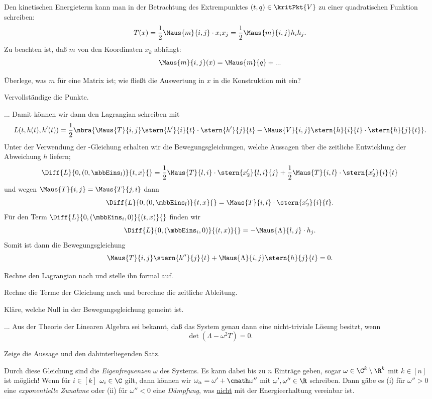 \documentclass[../WiSe22ANA3.tex]{subfiles}
\begin{document}
			Den kinetischen Energieterm kann man in der Betrachtung des Extrempunktes $(t,q)\in\kritPkt{V}$ zu einer quadratischen Funktion schreiben:
			$$T(x)=\frac{1}{2}\Maus{m}{i,j}\cdot x_ix_j=\frac{1}{2}\Maus{m}{i,j}h_ih_j.$$
			Zu beachten ist, daß $m$ von den Koordinaten $x_k$ abhängt:
			$$\Maus{m}{i,j}(x)=\Maus{m}{q}+...$$
			\begin{Aufgabe}
				\nr Überlege, was $m$ für eine Matrix ist; wie fließt die Auswertung in $x$ in die Konstruktion mit ein?
				
				\nr Vervollständige die Punkte. 
			\end{Aufgabe}
			... Damit können wir dann den Lagrangian schreiben mit
			$$L(t,h(t),h'(t))=\frac{1}{2}\nbra{\Maus{T}{i,j}\stern{h'}{i}{t}\cdot\stern{h'}{j}{t}-\Maus{V}{i,j}\stern{h}{i}{t}\cdot\stern{h}{j}{t}}.$$
			Unter der Verwendung der \Euler-\Lagrange Gleichung erhalten wir die Bewegungsgleichungen, welche Aussagen über die zeitliche Entwicklung der Abweichung $h$ liefern; 
			$$\Diff{L}{0,(0,\mbbEins_l)}{t,x}{}=\frac{1}{2}\Maus{T}{l,i}\cdot\stern{x_2'}{l,i}{j}+\frac{1}{2}\Maus{T}{i,l}\cdot\stern{x_2'}{i}{t}$$
			und wegen $\Maus{T}{i,j}=\Maus{T}{j,i}$ dann 
			$$\Diff{L}{0,(0,\mbbEins_l)}{t,x}{}=\Maus{T}{i,l}\cdot\stern{x_2'}{i}{t}.$$
			Für den Term $\Diff{L}{0,(\mbbEins_i,0)}{(t,x)}{}$ finden wir 
			$$\Diff{L}{0,(\mbbEins_i,0)}{(t,x)}{}=-\Maus{\Lambda}{l,j}\cdot h_j.$$
			Somit ist dann die Bewegungsgleichung 
			$$\Maus{T}{i,j}\stern{h''}{j}{t}+\Maus{\Lambda}{i,j}\stern{h}{j}{t}=0.$$
			\begin{Aufgabe}
				\nr Rechne den Lagrangian nach und stelle ihn formal auf. 
				
				\nr Rechne die Terme der \Euler \Lagrange Gleichung nach und berechne die zeitliche Ableitung. 
			
				\nr Kläre, welche Null in der Bewegungsgleichung gemeint ist.
			\end{Aufgabe}
			... Aus der Theorie der Linearen Algebra sei bekannt, daß das System genau dann eine nicht-triviale Lösung besitzt, wenn
			$$\det(\Lambda-\omega^2 T)=0.$$
			\begin{Aufgabe}
				\nr Zeige die Aussage und den dahinterliegenden Satz. 
			\end{Aufgabe}
			Durch diese Gleichung sind die \emph{Eigenfrequenzen} $\omega$ des Systems. Es kann dabei bis zu $n$ Einträge geben, sogar $\omega\in\C^k\setminus\R^k$ mit $k\in[n]$ ist möglich! Wenn für $i\in[k]$ $\omega_i\in\C$ gilt, dann können wir $\omega_\alpha=\omega'+\cmath \omega''$ mit $\omega',\omega''\in\R$ schreiben. Dann gäbe es (i) für $\omega''>0$ eine \emph{exponentielle Zunahme} oder (ii) für $\omega''<0$ eine \emph{Dämpfung}, was \underline{nicht} mit der Energieerhaltung vereinbar ist. 
			
\end{document}
